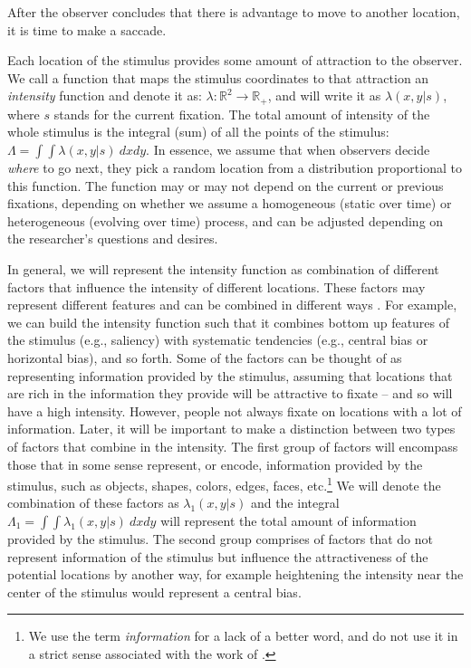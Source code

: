 \documentclass{article}
\begin{document}
After the observer concludes that there is advantage to move to another location, it is time to make a saccade.

Each location of the stimulus provides some amount of attraction to the observer. We call a function that maps the stimulus coordinates to that attraction an \textit{intensity} function and denote it as: $\lambda: \mathbb{R}^2 \rightarrow \mathbb{R}_+$, and will write it as $\lambda(x, y | s)$, where $s$ stands for the current fixation. The total amount of intensity of the whole stimulus is the integral (sum) of all the points of the stimulus: $\Lambda = \int\int \lambda(x, y | s)~dx dy$. In essence, we assume that when observers decide \textit{where} to go next, they pick a random location from a distribution proportional to this function. The function may or may not depend on the current or previous fixations, depending on whether we assume a homogeneous (static over time) or heterogeneous (evolving over time) process, and can be adjusted depending on the researcher's questions and desires.

In general, we will represent the intensity function as combination of different factors that influence the intensity of different locations. These factors may represent different features and can be combined in different ways \citep[see][]{barthelme2013spatial}. For example, we can build the intensity function such that it combines bottom up features of the stimulus (e.g., saliency) with systematic tendencies (e.g., central bias or horizontal bias), and so forth. Some of the factors can be thought of as representing information provided by the stimulus, assuming that locations that are rich in the information they provide will be attractive to fixate -- and so will have a high intensity. However, people not always fixate on locations with a lot of information. Later, it will be important to make a distinction between two types of factors that combine in the intensity. The first group of factors will encompass those that in some sense represent, or encode, information provided by the stimulus, such as objects, shapes, colors, edges, faces, etc.\footnote{We use the term \textit{information} for a lack of a better word, and do not use it in a strict sense associated with the work of \citet{shannon1948communication}.} We will denote the combination of these factors as $\lambda_1(x, y |s)$ and the integral $\Lambda_1 = \int\int \lambda_1(x, y | s)~dx dy$ will represent the total amount of information provided by the stimulus. The second group comprises of factors that do not represent information of the stimulus but influence the attractiveness of the potential locations by another way, for example heightening the intensity near the center of the stimulus would represent a central bias.
\end{document}
